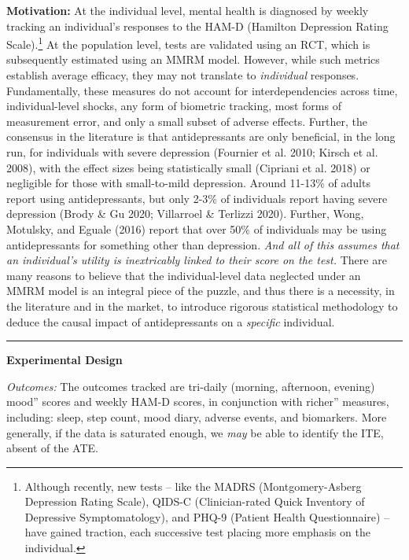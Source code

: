 \documentclass[12pt,letterpaper,doublespace, oneside]{article}
\begin{document}
\noindent\textbf{Motivation:} At the individual level, mental health is diagnosed by weekly tracking an individual’s responses to the HAM-D (Hamilton Depression Rating Scale).\footnote{Although recently, new tests -- like the MADRS (Montgomery-Asberg Depression Rating Scale), QIDS-C (Clinician-rated Quick Inventory of Depressive Symptomatology), and PHQ-9 (Patient Health Questionnaire) -- have gained traction, each successive test placing more emphasis on the individual.} At the population level, tests are validated using an RCT, which is subsequently estimated using an MMRM model. However, while such metrics establish average efficacy, they may not translate to \emph{individual} responses. Fundamentally, these measures do not account for interdependencies across time, individual-level shocks, any form of biometric tracking, most forms of measurement error, and only a small subset of adverse effects. Further, the consensus in the literature is that antidepressants are only beneficial, in the long run, for individuals with severe depression (Fournier et al. 2010; Kirsch et al. 2008), with the effect sizes being statistically small (Cipriani et al. 2018) or negligible for those with small-to-mild depression. Around 11-13\% of adults report using antidepressants, but only 2-3\% of individuals report having severe depression (Brody \& Gu 2020; Villarroel \& Terlizzi 2020). Further, Wong, Motulsky, and Eguale (2016) report that over 50\% of individuals may be using antidepressants for something other than depression. \emph{And all of this assumes that an individual’s utility is inextricably linked to their score on the test.} There are many reasons to believe that the individual-level data neglected under an MMRM model is an integral piece of the puzzle, and thus there is a necessity, in the literature and in the market, to introduce rigorous statistical methodology to deduce the causal impact of antidepressants on a \emph{specific} individual. 

\noindent\rule{\linewidth}{0.4pt}

\noindent
\textbf{Experimental Design} 

\emph{Outcomes:} The outcomes tracked are tri-daily (morning, afternoon, evening) mood'' scores and weekly HAM-D scores, in conjunction with richer'' measures, including: sleep, step count, mood diary, adverse events, and biomarkers. More generally, if the data is saturated enough, we \emph{may} be able to identify the ITE, absent of the ATE.

\noindent
\end{document}
